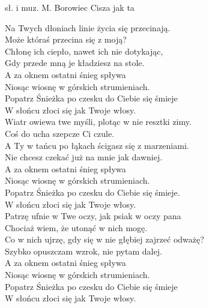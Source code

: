 {sł. i muz. M. Borowiec}
{Cisza jak ta}
\begin{text}
Na Twych dłoniach linie życia się przecinają.\\
Może któraś przecina się z moją?\\
Chłonę ich ciepło, nawet ich nie dotykając,\\
Gdy przede mną je kładziesz na stole.\\

\vin A za oknem ostatni śnieg spływa\\
\vin Niosąc wiosnę w górskich strumieniach.\\
\vin Popatrz Śnieżka po czesku do Ciebie się śmieje\\
\vin W słońcu złoci się jak Twoje włosy.\\

Wiatr owiewa twe myśli, plotąc w nie resztki zimy.\\
Coś do ucha szepcze Ci czule.\\
A Ty w tańcu po łąkach ścigasz się z marzeniami.\\
Nie chcesz czekać już na mnie jak dawniej.\\

\vin A za oknem ostatni śnieg spływa\\
\vin Niosąc wiosnę w górskich strumieniach.\\
\vin Popatrz Śnieżka po czesku do Ciebie się śmieje.\\
\vin W słońcu złoci się jak Twoje włosy.\\

Patrzę ufnie w Twe oczy, jak psiak w oczy pana\\
Chociaż wiem, że utonąć w nich mogę.\\
Co w nich ujrzę, gdy się w nie głębiej zajrzeć odważę? \\
Szybko opuszczam wzrok, nie pytam dalej.\\

\vin A za oknem ostatni śnieg spływa\\
\vin Niosąc wiosnę w górskich strumieniach.\\
\vin Popatrz Śnieżka po czesku do Ciebie się śmieje\\
\vin W słońcu złoci się jak Twoje włosy.\\
\end{text}
